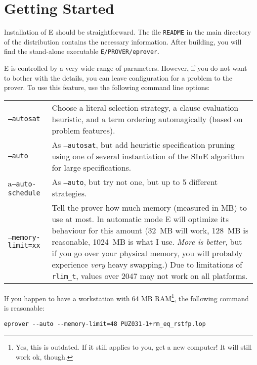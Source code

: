\documentclass{report}
\begin{document}
\chapter{Getting Started}
\label{sec:start}

Installation of E should be straightforward. The file \texttt{README}
in the main directory of the distribution contains the necessary
information. After building, you will find the stand-alone executable
\texttt{E/PROVER/eprover}.

E is controlled by a very wide range of parameters. However, if you do
not want to bother with the details, you can leave configuration for a
problem to the prover. To use this feature, use the following command
line options:

\bigskip
\noindent
\begin{tabular}{lp{7.5cm}}
  \texttt{--autosat}
  & Choose a literal selection strategy, a clause
    evaluation heuristic, and a term ordering automagically\index{xyzzy} (based on
    problem features).\\
  \texttt{--auto}
  & As \texttt{--autosat}, but add heuristic
    specification pruning using one of several instantiation of the SInE
    algorithm~\cite{HV:CADE-2011} for large specifications.\\
  a\texttt{--auto-schedule}
  & As \texttt{--auto}, but try not one, but
    up to 5 different strategies. \\
  \texttt{--memory-limit=xx}
  & Tell the prover how much memory
    (measured in MB) to use at most. In automatic mode E will optimize
    its behaviour for this amount (32~MB will work, 128~MB is
    reasonable, 1024~MB is what I use. \emph{More is
    better}\footnotemark, but if you go over
    your physical memory, you will probably experience \emph{very} heavy
    swapping.) Due to limitations of \texttt{rlim\_t}, values over 2047
    may not work on all platforms.\\
\end{tabular}
\begin{example}
  If you happen to have a workstation with 64 MB RAM\footnote{Yes,
    this is outdated. If it still applies to you, get a new
    computer! It will still work ok, though.}, the following command
  is reasonable:
\small
\begin{verbatim}
eprover --auto --memory-limit=48 PUZ031-1+rm_eq_rstfp.lop
\end{verbatim}
  \normalsize
\end{example}
\end{document}
